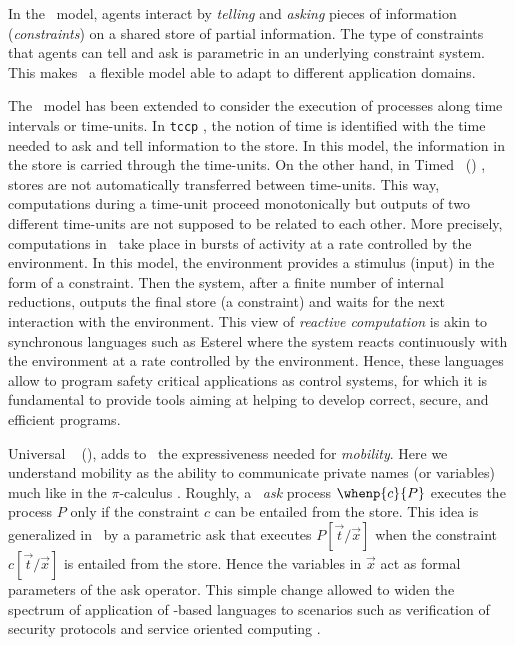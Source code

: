 \documentclass{tlp}
\begin{document}
In the \ccp\ model,
agents interact by \emph{telling} and \emph{asking} pieces of
information (\emph{constraints}) on a shared store of partial information.
The type of constraints that  agents can tell and ask is  parametric in an underlying constraint system. This makes \ccp\ a flexible model able to adapt to different application domains.

The \ccp\ model has been extended to consider the execution of processes along  time intervals or time-units. In  \texttt{tccp} \cite{bgm99}, 
 the notion of time is identified with the time needed to ask and tell information to the  store. In this model, the information in the store is carried through the time-units. On the other hand, in Timed \ccp\ (\tccp) \cite{tcc-lics94},
 stores are not automatically transferred between time-units. This way,  computations during a time-unit proceed 
monotonically but outputs of two different time-units are 
not supposed to be related to each other.
 More precisely, computations in \tccp\ take place in bursts of activity at a rate controlled by the environment. In this model,  the environment provides a stimulus (input) in the form of  a constraint. Then the system, after a finite 
number of internal reductions,  outputs the final store (a constraint) and  waits for the next interaction 
with the environment.  This view of \emph{reactive computation} is 
akin to synchronous languages such as Esterel \cite{BeGo92}  where the system 
reacts continuously 
with the environment at a rate controlled by the environment.  
Hence, these languages allow to program safety critical applications as control systems, 
for which it is fundamental to provide tools aiming at helping  to 
develop correct, secure, and efficient programs.

Universal \tccp\  \cite{Olarte:08:SAC}  (\utcc), adds to \tccp\ the expressiveness needed for \emph{mobility}. Here we understand mobility as the ability to communicate private names (or variables) much like in the $\pi$-calculus \cite{milner.parrow.ea:calculus-mobile}. Roughly, a \tccp\ \emph{ask} process $\whenp{c}{P}$ executes the process $P$ only if the constraint  $c$ can be entailed from the store. This idea is generalized in \utcc\ by  a parametric ask that executes $P[\vec{t}/\vec{x}]$ when the constraint $c[\vec{t}/\vec{x}]$ is entailed from the store. Hence the variables in $\vec{x}$ act as formal parameters of the ask operator. This simple change allowed to widen  the spectrum of application of \ccp-based languages to scenarios such as verification of security protocols \cite{Olarte:08:SAC} and service oriented computing \cite{Lopez-Places09}.
\end{document}
